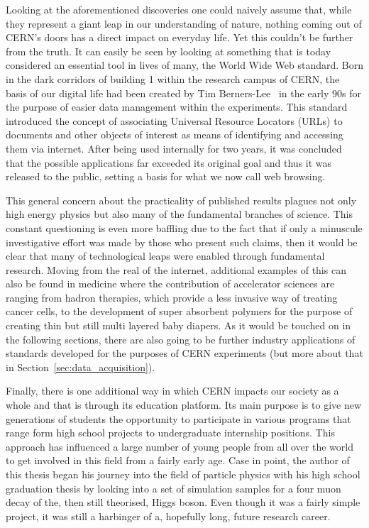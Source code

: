\hspace{10pt}Looking at the aforementioned discoveries one could naively assume that, while they represent a giant leap in our understanding of nature, nothing coming out of CERN's doors has a direct impact on everyday life. Yet this couldn't be further from the truth. It can easily be seen by looking at something that is today considered an essential tool in lives of many, the World Wide Web standard. Born in the dark corridors of building 1 within the research campus of CERN, the basis of our digital life had been created by Tim Berners-Lee~\cite{www_origins} in the early 90s for the purpose of easier data management within the experiments. This standard introduced the concept of associating Universal Resource Locators (URLs) to documents and other objects of interest as means of identifying and accessing them via internet. After being used internally for two years, it was concluded that the possible applications far exceeded its original goal and thus it was released to the public, setting a basis for what we now call web browsing.

\hspace{10pt}This general concern about the practicality of published results plagues not only high energy physics but also many of the fundamental branches of science. This constant questioning is even more baffling due to the fact that if only a minuscule investigative effort was made by those who present such claims, then it would be clear that many of technological leaps were enabled through fundamental research. Moving from the real of the internet, additional examples of this can also be found in medicine where the contribution of accelerator sciences are ranging from hadron therapies, which provide a less invasive way of treating cancer cells, to the development of super absorbent polymers for the purpose of creating thin but still multi layered baby diapers. As it would be touched on in the following sections, there are also going to be further industry applications of standards developed for the purposes of CERN experiments (but more about that in Section~\ref{sec:data_acquisition}).

\hspace{10pt} Finally, there is one additional way in which CERN impacts our society as a whole and that is through its education platform. Its main purpose is to give new generations of students the opportunity to participate in various programs that range form high school projects to undergraduate internship positions. This approach has influenced a large number of young people from all over the world to get involved in this field from a fairly early age. Case in point, the author of this thesis began his journey into the field of particle physics with his high school graduation thesis by looking into a set of simulation samples for a four muon decay of the, then still theorised, Higgs boson. Even though it was a fairly simple project, it was still a harbinger of a, hopefully long, future research career.

